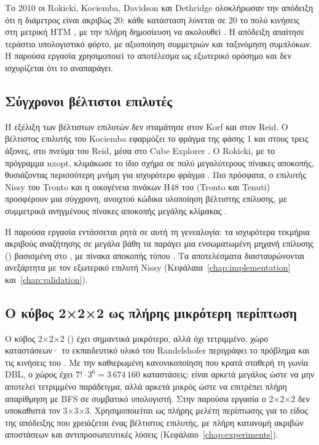 Το 2010 οι Rokicki, Kociemba, Davidson και Dethridge ολοκλήρωσαν την απόδειξη ότι η διάμετρος είναι ακριβώς 20: κάθε κατάσταση λύνεται σε 20 το πολύ κινήσεις στη μετρική HTM \cite{rokicki2010godsnumber}, με την πλήρη δημοσίευση να ακολουθεί \cite{rokicki2013diameter}. Η απόδειξη απαίτησε τεράστιο υπολογιστικό φόρτο, με αξιοποίηση συμμετριών και ταξινόμηση συμπλόκων. Η παρούσα εργασία χρησιμοποιεί το αποτέλεσμα ως εξωτερικό ορόσημο και δεν ισχυρίζεται ότι το αναπαράγει.

\subsection{Σύγχρονοι βέλτιστοι επιλυτές}
\label{sec:background-modern}

Η εξέλιξη των βέλτιστων επιλυτών δεν σταμάτησε στον Korf και στον Reid. Ο βέλτιστος επιλυτής του Kociemba εφαρμόζει το φράγμα της φάσης 1 και στους τρεις άξονες, στο πνεύμα του Reid, μέσα στο Cube Explorer \cite{kociembaOptimalSolver}. Ο Rokicki, με το πρόγραμμα nxopt, κλιμάκωσε το ίδιο σχήμα σε πολύ μεγαλύτερους πίνακες αποκοπής, θυσιάζοντας περισσότερη μνήμη για ισχυρότερο φράγμα \cite{rokickiNxopt}. Πιο πρόσφατα, ο επιλυτής Nissy του Tronto και η οικογένεια πινάκων H48 του  (Tronto και Tenuti) προσφέρουν μια σύγχρονη, ανοιχτού κώδικα υλοποίηση βέλτιστης επίλυσης, με συμμετρικά ανηγμένους πίνακες αποκοπής μεγάλης κλίμακας \cite{trontoNissyCoreH48}.

Η παρούσα εργασία εντάσσεται ρητά σε αυτή τη γενεαλογία: τα ισχυρότερα τεκμήρια ακριβούς αναζήτησης σε μεγάλα βάθη τα παράγει μια ενσωματωμένη μηχανή επίλυσης () βασισμένη στο , με πίνακα αποκοπής τύπου . Τα αποτελέσματα διασταυρώνονται ανεξάρτητα με τον εξωτερικό επιλυτή Nissy (Κεφάλαια~\ref{chap:implementation} και~\ref{chap:validation}).

\subsection{Ο κύβος 2×2×2 ως πλήρης μικρότερη περίπτωση}
\label{sec:background-pocket}

Ο κύβος 2×2×2 () έχει σημαντικά μικρότερο, αλλά όχι τετριμμένο, χώρο καταστάσεων· το εκπαιδευτικό υλικό του Randelshofer περιγράφει το πρόβλημα και τις κινήσεις του \cite{randelshoferPocketCube}. Με την καθιερωμένη κανονικοποίηση που κρατά σταθερή τη γωνία DBL, ο χώρος έχει \(7!\cdot3^{6}=3\,674\,160\) καταστάσεις: είναι αρκετά μεγάλος ώστε να μην αποτελεί τετριμμένο παράδειγμα, αλλά αρκετά μικρός ώστε να επιτρέπει πλήρη απαρίθμηση με BFS σε συμβατικό υπολογιστή. Στην παρούσα εργασία ο 2×2×2 δεν υποκαθιστά τον 3×3×3. Χρησιμοποιείται ως πλήρης μελέτη περίπτωσης για το είδος της απόδειξης που χρειάζεται ένας βέλτιστος επιλυτής, με πλήρη κατανομή ακριβών αποστάσεων και αντιπροσωπευτικές λύσεις (Κεφάλαιο~\ref{chap:experiments}).

